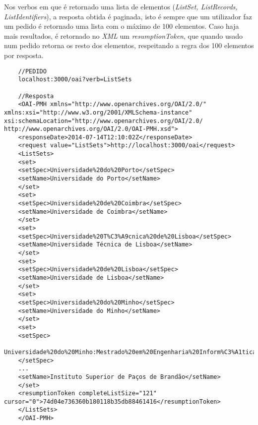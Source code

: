 Nos verbos em que é retornado uma lista de elementos (\emph{ListSet, ListRecords, ListIdentifiers}), a resposta obtida é paginada, isto é sempre que um utilizador faz um pedido é retornado uma lista com o máximo de 100 elementos. Caso haja mais resultados, é retornado no \emph{XML} um \emph{resumptionToken}, que quando usado num pedido retorna os resto dos elementos, respeitando a regra dos 100 elementos por resposta.

\begin{verbatim}
	//PEDIDO
	localhost:3000/oai?verb=ListSets

	//Resposta
	<OAI-PMH xmlns="http://www.openarchives.org/OAI/2.0/" xmlns:xsi="http://www.w3.org/2001/XMLSchema-instance" xsi:schemaLocation="http://www.openarchives.org/OAI/2.0/ http://www.openarchives.org/OAI/2.0/OAI-PMH.xsd">
	<responseDate>2014-07-14T12:10:02Z</responseDate>
	<request value="ListSets">http://localhost:3000/oai</request>
	<ListSets>
	<set>
	<setSpec>Universidade%20do%20Porto</setSpec>
	<setName>Universidade do Porto</setName>
	</set>
	<set>
	<setSpec>Universidade%20de%20Coimbra</setSpec>
	<setName>Universidade de Coimbra</setName>
	</set>
	<set>
	<setSpec>Universidade%20T%C3%A9cnica%20de%20Lisboa</setSpec>
	<setName>Universidade Técnica de Lisboa</setName>
	</set>
	<set>
	<setSpec>Universidade%20de%20Lisboa</setSpec>
	<setName>Universidade de Lisboa</setName>
	</set>
	<set>
	<setSpec>Universidade%20do%20Minho</setSpec>
	<setName>Universidade do Minho</setName>
	</set>
	<set>
	<setSpec>
	Universidade%20do%20Minho:Mestrado%20em%20Engenharia%20Inform%C3%A1tica
	</setSpec>
	...
	<setName>Instituto Superior de Paços de Brandão</setName>
	</set>
	<resumptionToken completeListSize="121" cursor="0">74d04e736360b180118b35db88461416</resumptionToken>
	</ListSets>
	</OAI-PMH>
\end{verbatim}
